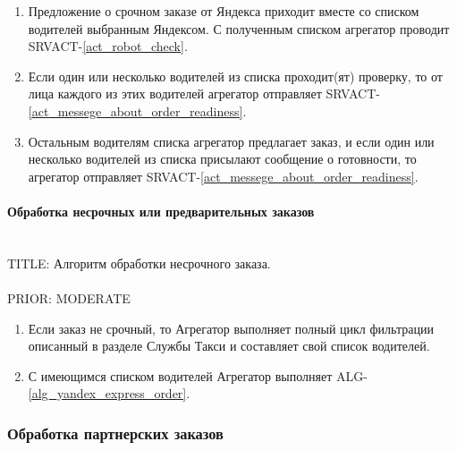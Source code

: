 				\begin{alg} \label{alg_yandex_express_order} \mbox{}

					\begin{enumerate}

						\item Предложение о срочном заказе от Яндекса приходит вместе со списком водителей выбранным Яндексом. С полученным списком агрегатор проводит SRVACT-\ref{act_robot_check}.

						\item Если один или несколько водителей из списка проходит(ят) проверку, то от лица каждого из этих водителей агрегатор отправляет SRVACT-\ref{act_messege_about_order_readiness}.
						
						\item Остальным водителям списка агрегатор предлагает заказ, и если один или несколько водителей из списка присылают сообщение о готовности, то агрегатор отправляет SRVACT-\ref{act_messege_about_order_readiness}. 

					\end{enumerate}

				\end{alg}

			\paragraph{Обработка несрочных или предварительных заказов} \mbox{} \\

				TITLE: Алгоритм обработки несрочного заказа.\\
				\\
				PRIOR: MODERATE\\

				\begin{alg} \label{alg_yandex_preliminary_order} \mbox{}

					\begin{enumerate}

						\item Если заказ не срочный, то Агрегатор выполняет полный цикл фильтрации описанный в разделе Службы Такси и составляет свой список водителей. 

						\item С имеющимся списком водителей Агрегатор выполняет ALG-\ref{alg_yandex_express_order}.

					\end{enumerate}

				\end{alg}



		\subsubsection{Обработка партнерских заказов}
